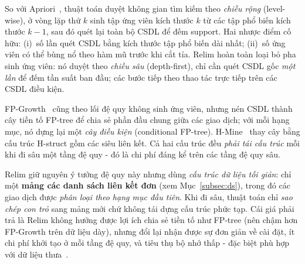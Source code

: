 \documentclass[12pt,a4paper]{report}
\begin{document}
So với Apriori~\cite{apriori1993}, thuật toán duyệt không gian tìm kiếm theo \textit{chiều rộng}
(level-wise), ở vòng lặp thứ $k$ sinh tập ứng viên kích thước $k$ từ các tập
phổ biến kích thước $k-1$, sau đó quét lại toàn bộ CSDL để đếm support. Hai
nhược điểm cố hữu: (i)~số lần quét CSDL bằng kích thước tập phổ biến dài nhất;
(ii)~số ứng viên có thể bùng nổ theo hàm mũ trước khi cắt tỉa. Relim
hoàn toàn loại bỏ pha sinh ứng viên: nó duyệt theo \textit{chiều sâu}
(depth-first), chỉ cần quét CSDL gốc \textit{một lần} để đếm tần suất ban đầu;
các bước tiếp theo thao tác trực tiếp trên các CSDL điều kiện.

FP-Growth~\cite{fpgrowth2000} cũng theo lối đệ quy không sinh ứng viên, nhưng
nén CSDL thành cây tiền tố FP-tree để chia sẻ phần đầu chung giữa các giao
dịch; với mỗi hạng mục, nó dựng lại một \textit{cây điều kiện} (conditional
FP-tree). H-Mine~\cite{hmine2001} thay cây bằng cấu trúc H-struct gồm các siêu
liên kết. Cả hai cấu trúc đều \textit{phải tái cấu trúc} mỗi khi đi sâu một
tầng đệ quy - đó là chi phí đáng kể trên các tầng đệ quy sâu.

\noindent
Relim giữ nguyên ý tưởng đệ quy này nhưng dùng \textit{cấu trúc dữ liệu tối
giản}: chỉ một \textbf{mảng các danh sách liên kết đơn} (xem
Mục~\ref{subsec:ds}), trong đó các giao dịch được \textit{phân loại theo
hạng mục đầu tiên}. Khi đi sâu, thuật toán chỉ \textit{sao chép con trỏ} sang
mảng mới chứ không tái dựng cấu trúc phức tạp. Cái giá phải trả là Relim không
hưởng được lợi ích chia sẻ tiền tố như FP-tree (nên chậm hơn FP-Growth trên dữ
liệu dày), nhưng đổi lại nhận được sự đơn giản về cài đặt, ít chi phí khởi tạo
ở mỗi tầng đệ quy, và tiêu thụ bộ nhớ thấp - đặc biệt phù hợp với dữ liệu
thưa~\cite{borgelt2005}.
\end{document}
